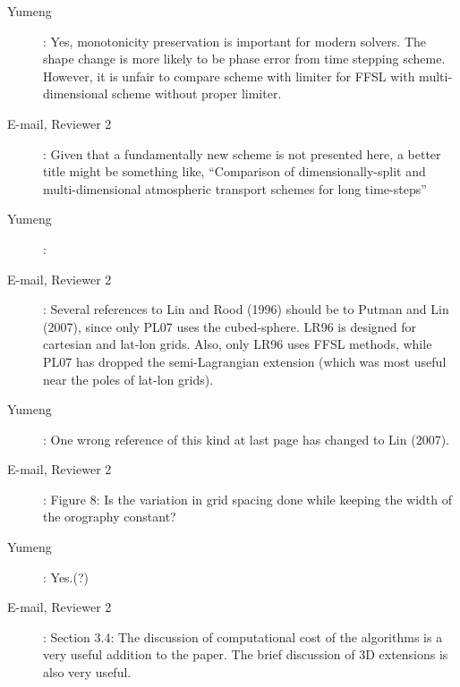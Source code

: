 \documentclass[12pt,a4paper]{article}
\begin{document}
\begin{description}
\item [Yumeng]: Yes, monotonicity preservation is important for modern solvers. The shape change is more likely to be phase error from time stepping scheme. However, it is unfair to compare scheme with limiter for FFSL with multi-dimensional scheme without proper limiter.

\item [E-mail, Reviewer 2]: Given that a fundamentally new scheme is not presented here, a better title might be something like, ``Comparison of dimensionally-split and multi-dimensional atmospheric transport schemes for long time-steps''

\item [Yumeng]: 

\item [E-mail, Reviewer 2]: Several references to Lin and Rood (1996) should be to Putman and Lin (2007), since only PL07 uses the cubed-sphere. LR96 is designed for cartesian and lat-lon grids. Also, only LR96 uses FFSL methods, while PL07 has dropped the semi-Lagrangian extension (which was most useful near the poles of lat-lon grids). 

\item [Yumeng]: One wrong reference of this kind at last page has changed to Lin (2007).

\item [E-mail, Reviewer 2]: Figure 8: Is the variation in grid spacing done while keeping the width of the orography constant? 

\item [Yumeng]:  Yes.(?)

\item [E-mail, Reviewer 2]: Section 3.4: The discussion of computational cost of the algorithms is a very useful addition to the paper. The brief discussion of 3D extensions is also very useful.
\end{description}


\end{document}

